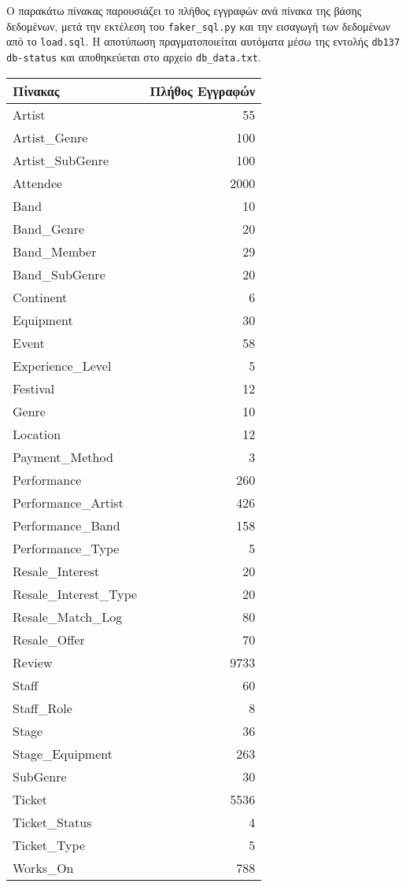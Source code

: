 \documentclass[13pt]{extarticle}
\begin{document}
Ο παρακάτω πίνακας παρουσιάζει το πλήθος εγγραφών ανά πίνακα της βάσης δεδομένων, μετά την εκτέλεση του \texttt{faker\_sql.py} και την εισαγωγή των δεδομένων από το \texttt{load.sql}. Η αποτύπωση πραγματοποιείται αυτόματα μέσω της εντολής \texttt{db137 db-status} και αποθηκεύεται στο αρχείο \texttt{db\_data.txt}.

\vspace{1cm}
\begin{center}
\begin{tabular}{|l|r|}
\hline
\textbf{Πίνακας} & \textbf{Πλήθος Εγγραφών} \\
\hline
Artist & 55 \\
Artist\_Genre & 100 \\
Artist\_SubGenre & 100 \\
Attendee & 2000 \\
Band & 10 \\
Band\_Genre & 20 \\
Band\_Member & 29 \\
Band\_SubGenre & 20 \\
Continent & 6 \\
Equipment & 30 \\
Event & 58 \\
Experience\_Level & 5 \\
Festival & 12 \\
Genre & 10 \\
Location & 12 \\
Payment\_Method & 3 \\
Performance & 260 \\
Performance\_Artist & 426 \\
Performance\_Band & 158 \\
Performance\_Type & 5 \\
Resale\_Interest & 20 \\
Resale\_Interest\_Type & 20 \\
Resale\_Match\_Log & 80 \\
Resale\_Offer & 70 \\
Review & 9733 \\
Staff & 60 \\
Staff\_Role & 8 \\
Stage & 36 \\
Stage\_Equipment & 263 \\
SubGenre & 30 \\
Ticket & 5536 \\
Ticket\_Status & 4 \\
Ticket\_Type & 5 \\
Works\_On & 788 \\
\hline
\end{tabular}
\end{center}
\end{document}
